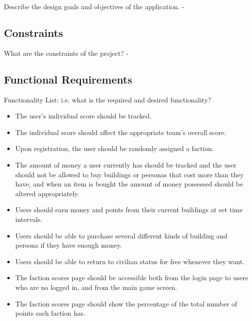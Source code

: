 \documentclass{sig-alt-release2}
\begin{document}
Describe the design goals and objectives of the application.
-

\subsection{Constraints}

What are the constraints of the project?
-

\subsection{Functional Requirements}

Functionality List: i.e. what is the required and desired functionality?

\begin{itemize}

\item The user's individual score should be tracked.

\item The individual score should affect the appropriate team's overall score.

\item Upon registration, the user should be randomly assigned a faction.

\item The amount of money a user currently has should be tracked and the user should not be allowed to buy buildings or personas that cost more than they have, and when an item is bought the amount of money possessed should be altered appropriately.

\item Users should earn money and points from their current buildings at set time intervals.

\item Users should be able to purchase several different kinds of building and persona if they have enough money.

\item Users should be able to return to civilian status for free whenever they want.

\item The faction scores page should be accessible both from the login page to users who are no logged in, and from the main game screen.

\item The faction scores page should show the percentage of the total number of points each faction has.

\end{itemize}
\end{document}
